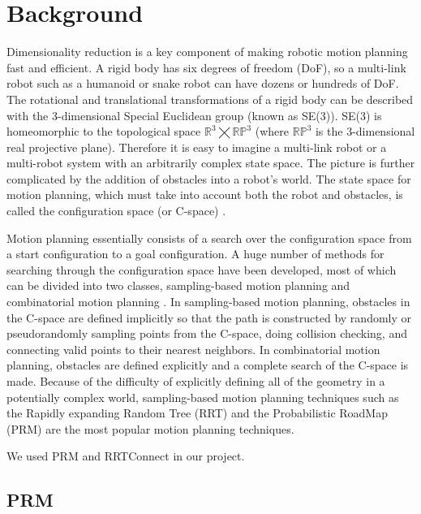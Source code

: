 \documentclass[12pt]{article}
\begin{document}
\maketitle

\section{Background}

Dimensionality reduction is a key component of making robotic motion planning
fast and efficient. A rigid body has six degrees of freedom (DoF), so a
multi-link robot such as a humanoid or snake robot can have dozens or hundreds
of DoF. The rotational and translational transformations of a rigid body can be
described with the 3-dimensional Special Euclidean group (known as SE(3)).
SE(3) is homeomorphic to the topological space
$\mathbb{R}^3\bigtimes\mathbb{RP}^3$ (where $\mathbb{RP}^3$ is the
3-dimensional real projective plane). Therefore it is easy to imagine a
multi-link robot \cite{kuindersma2015optimization} or a multi-robot system
\cite{alonso2015multi} with an arbitrarily complex state space. The picture is
further complicated by the addition of obstacles into a robot's world. The
state space for motion planning, which must take into account both the robot
and obstacles, is called the configuration space (or C-space)
\cite{lozano1983spatial}. 

Motion planning essentially consists of a search over the configuration space
from a start configuration to a goal configuration. A huge number of methods
for searching through the configuration space have been developed, most of
which can be divided into two classes, sampling-based motion planning and
combinatorial motion planning \cite{lavalle2006planning}. In sampling-based
motion planning, obstacles in the C-space are defined implicitly so that the
path is constructed by randomly or pseudorandomly sampling points from the
C-space, doing collision checking, and connecting valid points to their nearest
neighbors. In combinatorial motion planning, obstacles are defined explicitly
and a complete search of the C-space is made. Because of the difficulty of
explicitly defining all of the geometry in a potentially complex world,
sampling-based motion planning techniques such as the Rapidly expanding Random
Tree (RRT) and the Probabilistic RoadMap (PRM) are the most popular motion
planning techniques.

We used PRM and RRTConnect in our project. 

\subsection{PRM}
\end{document}
